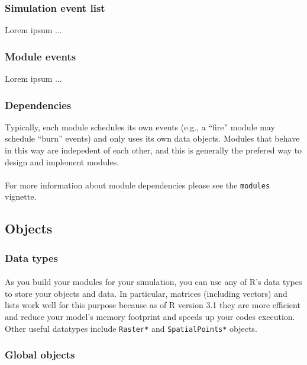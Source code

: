 \documentclass{article}
\begin{document}
\subsubsection{Simulation event list}
Lorem ipsum ...

\subsubsection{Module events}
Lorem ipsum ...

\subsubsection{Dependencies}
Typically, each module schedules its own events (e.g., a ``fire'' module may schedule ``burn'' events) and only uses its own data objects. Modules that behave in this way are indepedent of each other, and this is generally the prefered way to design and implement modules.

\paragraph{}
For more information about module dependencies please see the \texttt{modules} vignette.

\subsection{Objects}

\subsubsection{Data types}

\paragraph{}
As you build your modules for your simulation, you can use any of \textsf{R}'s data types to store your objects and data. In particular, matrices (including vectors) and lists work well for this purpose because as of \textsf{R} version 3.1 they are more efficient and reduce your model's memory footprint and speeds up your codes execution. Other useful datatypes include \texttt{Raster*} and \texttt{SpatialPoints*} objects.

\subsubsection{Global objects}
\end{document}
